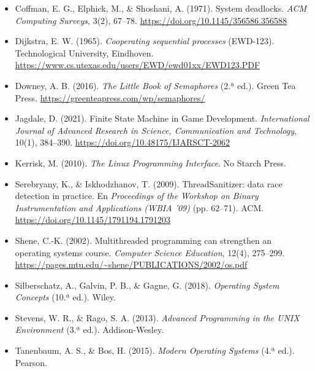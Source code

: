 \documentclass[11pt,a4paper]{article}
\renewcommand{\_}{\textunderscore\allowbreak}
\begin{document}
\begin{itemize}[leftmargin=*,label=\textbullet]
  \item Coffman, E. G., Elphick, M., \& Shoshani, A. (1971). System deadlocks. \emph{ACM Computing Surveys}, 3(2), 67--78. \url{https://doi.org/10.1145/356586.356588}
  \item Dijkstra, E. W. (1965). \emph{Cooperating sequential processes} (EWD-123). Technological University, Eindhoven. \url{https://www.cs.utexas.edu/users/EWD/ewd01xx/EWD123.PDF}
  \item Downey, A. B. (2016). \emph{The Little Book of Semaphores} (2.ª ed.). Green Tea Press. \url{https://greenteapress.com/wp/semaphores/}
  \item Jagdale, D. (2021). Finite State Machine in Game Development. \emph{International Journal of Advanced Research in Science, Communication and Technology}, 10(1), 384--390. \url{https://doi.org/10.48175/IJARSCT-2062}
  \item Kerrisk, M. (2010). \emph{The Linux Programming Interface}. No Starch Press.
  \item Serebryany, K., \& Iskhodzhanov, T. (2009). ThreadSanitizer: data race detection in practice. En \emph{Proceedings of the Workshop on Binary Instrumentation and Applications (WBIA '09)} (pp. 62--71). ACM. \url{https://doi.org/10.1145/1791194.1791203}
  \item Shene, C.-K. (2002). Multithreaded programming can strengthen an operating systems course. \emph{Computer Science Education}, 12(4), 275--299. \url{https://pages.mtu.edu/~shene/PUBLICATIONS/2002/os.pdf}
  \item Silberschatz, A., Galvin, P. B., \& Gagne, G. (2018). \emph{Operating System Concepts} (10.ª ed.). Wiley.
  \item Stevens, W. R., \& Rago, S. A. (2013). \emph{Advanced Programming in the UNIX Environment} (3.ª ed.). Addison-Wesley.
  \item Tanenbaum, A. S., \& Bos, H. (2015). \emph{Modern Operating Systems} (4.ª ed.). Pearson.
\end{itemize}
\end{document}
